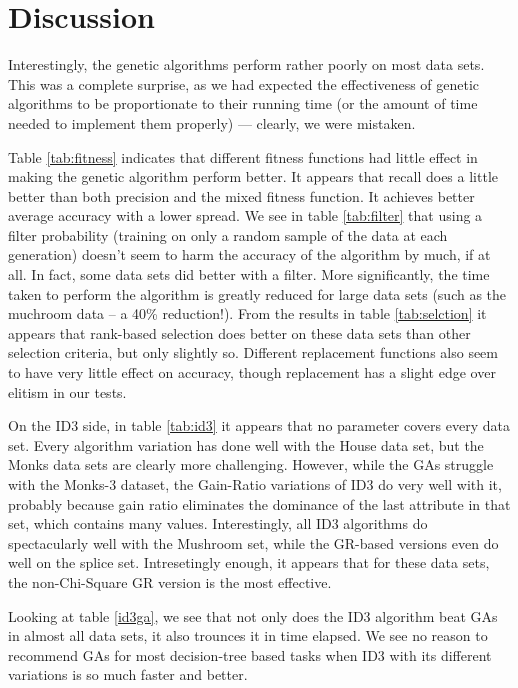 \documentclass[12pt, letterpaper]{article}
\begin{document}
\section{Discussion}

Interestingly, the genetic algorithms perform rather poorly on most data sets. This was a complete surprise, as we had expected the effectiveness of genetic algorithms to be proportionate to their running time (or the amount of time needed to implement them properly)  --- clearly, we were mistaken. 

Table \ref{tab:fitness} indicates that different fitness functions had little effect in making the genetic algorithm perform better. It appears that recall does a little better than both precision and the mixed fitness function. It achieves better average accuracy with a lower spread. 
We see in table \ref{tab:filter} that using a filter probability (training on only a random sample of the data at each generation) doesn't seem to harm the accuracy of the algorithm by much, if at all. In fact, some data sets did better with a filter. More significantly, the time taken to perform the algorithm is greatly reduced for large data sets (such as the muchroom data -- a 40\% reduction!).  
From the results in table \ref{tab:selction} it appears that rank-based selection does better on these data sets than other selection criteria, but only slightly so. Different replacement functions also seem to have very little effect on accuracy, though replacement has a slight edge over elitism in our tests.

On the ID3 side, in table \ref{tab:id3} it appears that no parameter covers every data set. Every algorithm variation has done well with the House data set, but the Monks data sets are clearly more challenging. However, while the GAs struggle with the Monks-3 dataset, the Gain-Ratio variations of ID3 do very well with it, probably because gain ratio eliminates the dominance of the last attribute in that set, which contains many values. Interestingly, all ID3 algorithms do spectacularly well with the Mushroom set, while the GR-based versions even do well on the splice set. Intresetingly enough, it appears that for these data sets, the non-Chi-Square GR version is the most effective.

Looking at table \ref{id3ga}, we see that not only does the ID3 algorithm beat GAs in almost all data sets, it also trounces it in time elapsed. We see no reason to recommend GAs for most decision-tree based tasks when ID3 with its different variations is so much faster and better.
\end{document}
